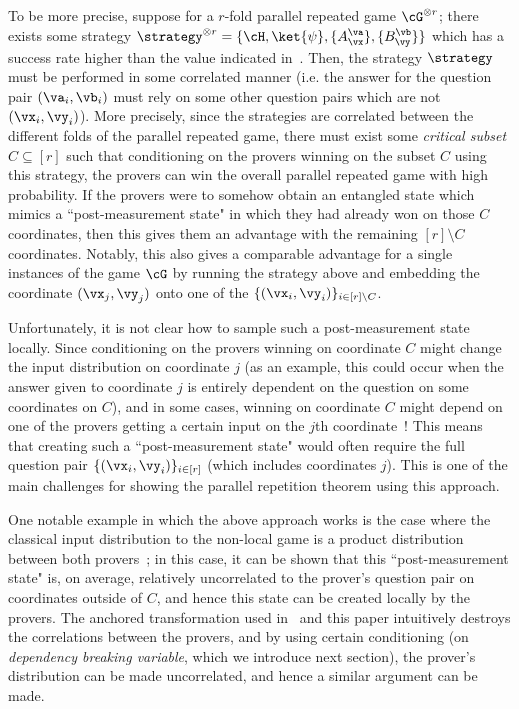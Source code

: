 To be more precise, suppose for a $r$-fold parallel repeated game $\cG^{\otimes r}$; there exists some strategy $\strategy^{\otimes r} = \{ \cH, \ket{\psi}, \{A_\vx^\va \}, \{B_\vy^\vb \} \}$ which has a success rate higher than the value indicated in~. Then, the strategy $\strategy$ must be performed in some correlated manner (i.e. the answer for the question pair $(\va_i,\vb_i)$ must rely on some other question pairs which are not $(\vx_i,\vy_i)$). More precisely, since the strategies are correlated between the different folds of the parallel repeated game,  there must exist some \textit{critical subset} $C \subseteq [r]$ such that conditioning on the provers winning on the subset $C$ using this strategy, the provers can win the overall parallel repeated game with high probability. If the provers were to somehow obtain an entangled state which mimics a ``post-measurement state" in which they had already won on those $C$ coordinates, then this gives them an advantage with the remaining $[r] \setminus C$ coordinates. Notably, this also gives a comparable advantage for a single instances of the game $\cG$ by running the strategy above and embedding the coordinate $(\vx_j, \vy_j)$ onto one of the $\{(\vx_i,\vy_i)\}_{i \in [r] \setminus C}$.

Unfortunately, it is not clear how to sample such a post-measurement state locally. Since conditioning on the provers winning on coordinate $C$ might change the input distribution on coordinate $j$ (as an example, this could occur when the answer given to coordinate $j$ is entirely dependent on the question on some coordinates on $C$), and in some cases, winning on coordinate $C$ might depend on one of the provers getting a certain input on the $j$th coordinate~! This means that creating such a ``post-measurement state" would often require the full question pair $\{(\vx_i,\vy_i)\}_{i \in [r]}$ (which includes coordinates $j$). This is one of the main challenges for showing the parallel repetition theorem using this approach.

One notable example in which the above approach works is the case where the classical input distribution to the non-local game is a product distribution between both provers~\cite{jainParallelDeviceIndependentQuantum2020}; in this case, it can be shown that this ``post-measurement state" is, on average, relatively uncorrelated to the prover's question pair on coordinates outside of $C$, and hence this state can be created locally by the provers. The anchored transformation used in~\cite{bavarianAnchoredParallelRepetition2021} and this paper intuitively destroys the correlations between the provers, and by using certain conditioning (on \textit{dependency breaking variable}, which we introduce next section), the prover's distribution can be made uncorrelated, and hence a similar argument can be made. 


